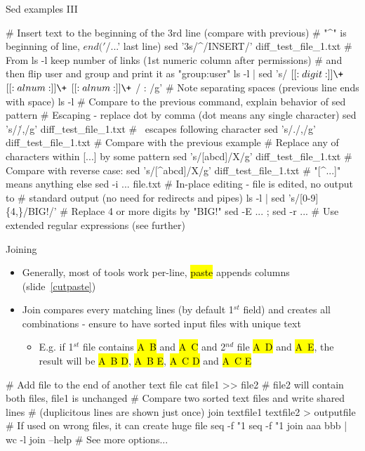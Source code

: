 \documentclass[compress, ucs, xelatex, 11pt, xcolor=svgnames,
  hyperref={
    bookmarks=true,
    unicode=true,
    colorlinks=true,
    pdftitle={Linux, command line and MetaCentrum},
    plainpages=false,
    pdfauthor={Vojtech Zeisek},
    pdfsubject={Course about use of Linux command line, writing shell scripts and using MetaCentrum of CESNET},
    pdfcreator={XeLaTeX},
    pdfkeywords={Linux, GNU, BASH, shell, command line, MetaCentrum},
    linkcolor=DarkRed,
    anchorcolor=DarkBlue,
    citecolor=Indigo,
    filecolor=NavyBlue,
    menucolor=DarkMagenta,
    urlcolor=DarkBlue,
    pdftex},
  url={hyphens, lowtilde} %
  ]{beamer}
\renewcommand{\texttt}[1]{\hl{\ttfamily #1}}
\begin{document}
\begin{frame}[fragile]{Sed examples III}
  \begin{bashcode}
    # Insert text to the beginning of the 3rd line (compare with previous)
    # "^" is beginning of line, $ end ('$/...' last line)
    sed '3s/^/INSERT/' diff_test_file_1.txt
    # From ls -l keep number of links (1st numeric column after permissions)
    # and then flip user and group and print it as "group:user"
    ls -l | sed 's/ \([[:digit:]]\+\) \([[:alnum:]]\+\) \([[:alnum:]]\+\) /
      \1 \3:\2 /g' # Note separating spaces (previous line ends with space)
    ls -l # Compare to the previous command, explain behavior of sed pattern
    # Escaping - replace dot by comma (dot means any single character)
    sed 's/\./,/g' diff_test_file_1.txt # \ escapes following character
    sed 's/./,/g' diff_test_file_1.txt # Compare with the previous example
    # Replace any of characters within [...] by some pattern
    sed 's/[abcd]/X/g' diff_test_file_1.txt # Compare with reverse case:
    sed 's/[^abcd]/X/g' diff_test_file_1.txt # "[^...]" means anything else
    sed -i ... file.txt # In-place editing - file is edited, no output to
                        # standard output (no need for redirects and pipes)
    ls -l | sed 's/[0-9]\{4,\}/BIG!/' # Replace 4 or more digits by "BIG!"
    sed -E ... ; sed -r ... # Use extended regular expressions (see further)
  \end{bashcode}
\end{frame}

\begin{frame}[fragile]{Joining}
  \begin{itemize}
    \item Generally, most of tools work per-line, \texttt{paste} appends columns (slide~\ref{cutpaste})
    \item Join compares every matching lines (by default 1$^{st}$ field) and creates all combinations - ensure to have sorted input files with unique text
    \begin{itemize}
      \item E.g. if 1$^{st}$ file contains \texttt{A~B} and \texttt{A~C} and 2$^{nd}$ file \texttt{A~D} and \texttt{A~E}, the result will be \texttt{A~B D}, \texttt{A~B E}, \texttt{A~C D} and \texttt{A~C E}
    \end{itemize}
  \end{itemize}
  \begin{bashcode}
    # Add file to the end of another text file
    cat file1 >> file2 # file2 will contain both files, file1 is unchanged
    # Compare two sorted text files and write shared lines
    # (duplicitous lines are shown just once)
    join textfile1 textfile2 > outputfile
    # If used on wrong files, it can create huge file
    seq -f "1 %
    seq -f "1 %
    join aaa bbb | wc -l
    join --help # See more options...
  \end{bashcode}
  \vfill
\end{frame}
\end{document}
